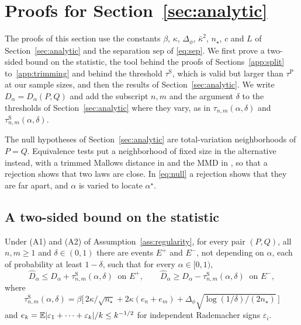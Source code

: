 \section{Proofs for Section~\ref{sec:analytic}}
\label{app:analytic}

The proofs of this section use the constants $\beta$, $\kappa$, $\Delta_\phi$, $\bar\kappa^2$, $n_\star$, $c$ and $L$ of
Section~\ref{sec:analytic} and the separation $\mathrm{sep}$ of \eqref{eq:sep}. We first prove a two-sided bound on the
statistic, the tool behind the proofs of Sections~\ref{app:split} to~\ref{app:trimming} and behind the threshold
$\tau^{\mathrm S}$, which is valid but larger than $\tau^{\mathrm P}$ at our sample sizes, and then the results of
Section~\ref{sec:analytic}. We write $D_\alpha=D_\alpha(P,Q)$ and add
the subscript $n,m$ and the argument $\delta$ to the thresholds of Section~\ref{sec:analytic} where they vary, as in
$\tau_{n,m}(\alpha,\delta)$ and $\tau^{\mathrm S}_{n,m}(\alpha,\delta)$.

The null hypotheses of Section~\ref{sec:analytic} are total-variation neighborhoods of $P=Q$. Equivalence tests \citep{wellek2010equivalence}
put a neighborhood of fixed size in the alternative instead, with a trimmed Mallows distance in
\citet{munkczado1998} and the MMD in \citet{liugandy2026equivalence}, so that a rejection shows that two laws are
close. In \eqref{eq:null} a rejection shows that they are far apart, and $\alpha$ is varied to locate $\alpha^\star$.

\subsection{A two-sided bound on the statistic}

\begin{theorem}
\label{thm:twosided}
Under (A1) and (A2) of Assumption~\ref{ass:regularity}, for every pair $(P,Q)$, all $n,m\ge1$ and $\delta\in(0,1)$
there are events $E^+$ and $E^-$, not depending on $\alpha$, each of probability at least $1-\delta$, such that for every
$\alpha\in[0,1)$,
\[
\widehat D_\alpha\le D_\alpha+\tau^{\mathrm S}_{n,m}(\alpha,\delta)\ \text{ on }E^+,
\qquad
\widehat D_\alpha\ge D_\alpha-\tau^{\mathrm S}_{n,m}(\alpha,\delta)\ \text{ on }E^-,
\]
where
\begin{equation}
\tau^{\mathrm S}_{n,m}(\alpha,\delta)=\beta\Big[\,2\kappa/\sqrt{n_\star}+2\kappa(e_n+e_m)+\Delta_\phi\sqrt{\log(1/\delta)/(2n_\star)}\,\Big]
\label{eq:tauA}
\end{equation}
and $e_k=\mathbb{E}|\varepsilon_1+\dots+\varepsilon_k|/k\le k^{-1/2}$ for independent Rademacher signs $\varepsilon_i$.
\end{theorem}

